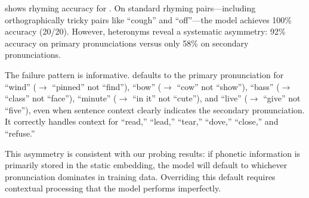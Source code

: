  shows rhyming accuracy for \gptfour.
On standard rhyming pairs---including orthographically tricky pairs like ``cough'' and ``off''---the model achieves 100\% accuracy (20/20).
However, heteronyms reveal a systematic asymmetry: 92\% accuracy on primary pronunciations versus only 58\% on secondary pronunciations.

The failure pattern is informative.
\gptfour defaults to the primary pronunciation for ``wind'' ($\rightarrow$ ``pinned'' not ``find''), ``bow'' ($\rightarrow$ ``cow'' not ``show''), ``bass'' ($\rightarrow$ ``class'' not ``face''), ``minute'' ($\rightarrow$ ``in it'' not ``cute''), and ``live'' ($\rightarrow$ ``give'' not ``five''), even when sentence context clearly indicates the secondary pronunciation.
It correctly handles context for ``read,'' ``lead,'' ``tear,'' ``dove,'' ``close,'' and ``refuse.''

This asymmetry is consistent with our probing results: if phonetic information is primarily stored in the static embedding, the model will default to whichever pronunciation dominates in training data.
Overriding this default requires contextual processing that the model performs imperfectly.
